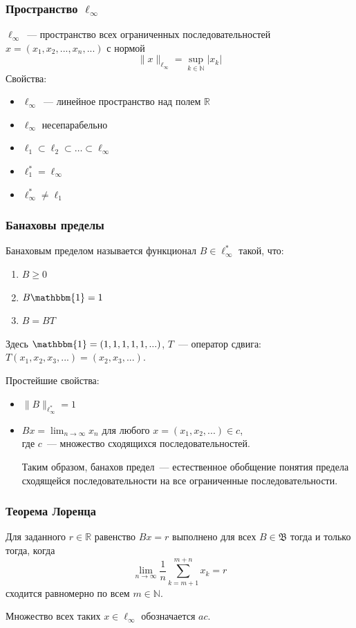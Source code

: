 \documentclass[10pt,pdf,hyperref={unicode},aspectratio=169]{beamer}
\theoremstyle{definition}
\begin{document}
\begin{frame}
	\frametitle{Пространство $\ell_\infty$}
	$\ell_\infty$~--- пространство всех ограниченных последовательностей
	$x=(x_1, x_2, ..., x_n, ...)$
	с нормой
	$$
		\|x\|_{\ell_\infty} = \sup_{k\in\mathbb{N}} |x_k|
	$$
	{Свойства:}

	\begin{itemize}
		\item
			$\ell_\infty$~--- линейное пространство над полем $\mathbb{R}$
		\item
			$\ell_\infty$  несепарабельно
		\item
			$\ell_1 \subset \ell_2 \subset \dots \subset \ell_\infty$
		\item
			$\ell_1^* = \ell_\infty$
		\item
			$\ell_\infty^* \neq \ell_1$
	\end{itemize}
\end{frame}

\begin{frame}\frametitle{Банаховы пределы}
	Банаховым пределом называется функционал $B\in \ell_\infty^*$ такой, что:
	\begin{enumerate}
		\item
			$B \geqslant 0$
		\item
			$B\mathbbm{1} = 1$
		\item
			$B=BT$
	\end{enumerate}
	Здесь $\mathbbm{1}=(1,1,1,1,1,...)$,
	$T$~--- оператор сдвига: $T(x_1, x_2, x_3, ...) = (x_2, x_3, ...)$.

	Простейшие свойства:
	\begin{itemize}
		\item
			$\|B\|_{\ell_\infty^*} = 1$
		\item
			$Bx = \lim_{n\to\infty} x_n$ для любого $x=(x_1, x_2, ...) \in c$,
			\\
			где $c$~--- множество сходящихся последовательностей.

			Таким образом,
			банахов предел~--- естественное обобщение понятия предела сходящейся последовательности
			на все ограниченные последовательности.
	\end{itemize}
\end{frame}

\begin{frame}\frametitle{Теорема Лоренца}
	Для заданного $r\in\mathbb{R}$ равенство $Bx=r$ выполнено для всех $B\in\mathfrak{B}$
	тогда и только тогда, когда
	\begin{equation*}
		\lim_{n\to\infty} \frac{1}{n} \sum_{k=m+1}^{m+n} x_k = r
	\end{equation*}
	сходится равномерно по всем $m\in\mathbb{N}$.

	Множество всех таких $x \in \ell_\infty$ обозначается $ac$.
\end{frame}
\end{document}
